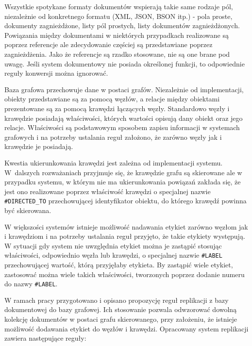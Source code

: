 \documentclass[a4paper,twoside,12pt]{book}
\begin{document}
Wszystkie spotykane formaty dokumentów wspierają takie same rodzaje pól, niezależnie od konkretnego formatu (XML, JSON, BSON itp.) - pola proste, dokumenty zagnieżdżone, listy pól prostych, listy dokumentów zagnieżdżonych. Powiązania między dokumentami w niektórych przypadkach realizowane są poprzez referencje ale zdecydowanie częściej są przedstawiane poprzez zagnieżdżenia. Jako że referencje są rzadko stosowane, nie są one brane pod uwagę. Jeśli system dokumentowy nie posiada określonej funkcji, to odpowiednie reguły konwersji można ignorować.

Baza grafowa przechowuje dane w postaci grafów. Niezależnie od implementacji, obiekty przedstawiane są za pomocą węzłów, a relacje między obiektami prezentowane są za pomocą krawędzi łączących węzły. Standardowo węzły i krawędzie posiadają właściwości, których wartości opisują dany obiekt oraz jego relacje. Właściwości są podstawowym sposobem zapisu informacji w systemach grafowych i na potrzeby ustalania reguł założono, że zarówno węzły jak i krawędzie je posiadają.

Kwestia ukierunkowania krawędzi jest zależna od implementacji systemu. W~dalszych rozważaniach przyjmuje się, że krawędzie grafu są skierowane ale w przypadku systemu, w którym nie ma ukierunkowania powiązań zakłada się, że jest ono realizowane poprzez właściwość krawędzi o specjalnej nazwie \texttt{\#DIRECTED\_TO} przechowującej identyfikator obiektu, do którego krawędź powinna być skierowana. 

W większości systemów istnieje możliwość nadawania etykiet zarówno węzłom jak i krawędziom i na potrzeby ustalania reguł przyjęto, że takie etykiety występują. W sytuacji gdy system nie uwzględnia etykiet można je zastąpić stosując właściwości, odpowiednio węzła lub krawędzi, o specjalnej nazwie \texttt{\#LABEL} przechowującej wartość, którą przyjęłaby etykieta. By zastąpić wiele etykiet, zastosować można wiele takich właściwości, tworzonych poprzez dodanie numeru do nazwy \texttt{\#LABEL}. 

W ramach pracy przygotowano i opisano propozycję reguł replikacji z bazy dokumentowej do bazy grafowej. Ich stosowanie pozwala odwzorować dowolną kolekcję dokumentów w postaci grafu skierowanego, przy założeniu, że istnieje możliwość dodawania etykiet do węzłów i krawędzi. Opracowany system replikacji zawiera następujące reguły:
\end{document}
